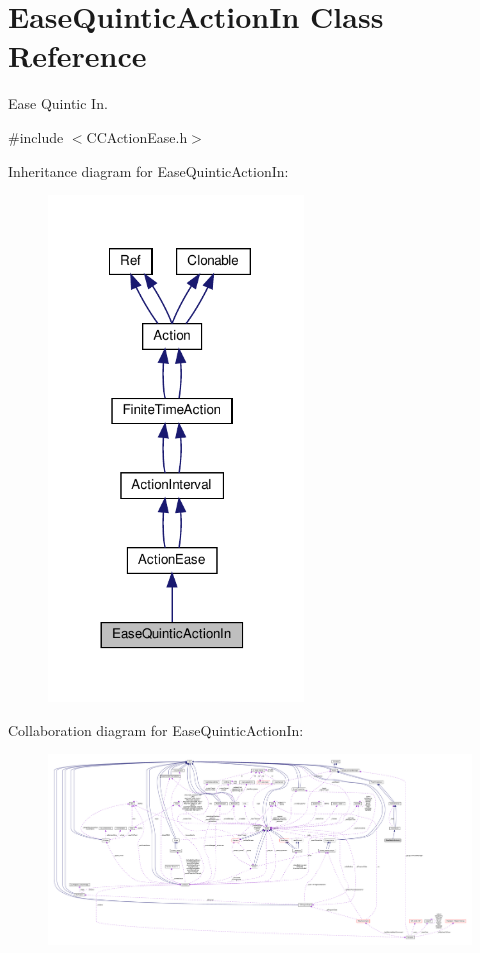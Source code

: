 \hypertarget{classEaseQuinticActionIn}{}\section{Ease\+Quintic\+Action\+In Class Reference}
\label{classEaseQuinticActionIn}


Ease Quintic In.  




{\ttfamily \#include $<$C\+C\+Action\+Ease.\+h$>$}



Inheritance diagram for Ease\+Quintic\+Action\+In\+:
\nopagebreak
\begin{figure}[H]
\begin{center}
\leavevmode
\includegraphics[width=192pt]{classEaseQuinticActionIn__inherit__graph}
\end{center}
\end{figure}


Collaboration diagram for Ease\+Quintic\+Action\+In\+:
\nopagebreak
\begin{figure}[H]
\begin{center}
\leavevmode
\includegraphics[width=350pt]{classEaseQuinticActionIn__coll__graph}
\end{center}
\end{figure}
